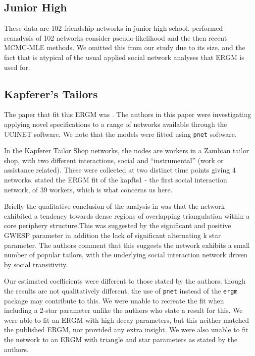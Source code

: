 \documentclass[
]{statsoc}
\begin{document}
\subsection{Junior High}

These data are 102 friendship networks in junior high school.
\cite{Lubbers2007} performed reanalysis of 102 networks consider
pseudo-likelihood and the then recent MCMC-MLE methods. We omitted this
from our study due to its size, and the fact that is atypical of the
usual applied social network analyses that ERGM is used for.

\subsection{Kapferer's Tailors}

The paper that fit this ERGM was \cite{Robins2007}. The authors in this
paper were investigating applying novel specifications to a range of
networks available through the UCINET software. We note that the models
were fitted using \texttt{pnet} software.

In the Kapferer Tailor Shop networks, the nodes are workers in a Zambian
tailor shop, with two different interactions, social and
``instrumental'' (work or assistance related). These were collected at
two distinct time points giving 4 networks. \cite{Robins2007} stated the
ERGM fit of the kapfts1 - the first social interaction network, of 39
workers, which is what concerns us here.

Briefly the qualitative conclusion of the analysis in \cite{Robins2007}
was that the network exhibited a tendency towards dense regions of
overlapping triangulation within a core periphery structure.This was
suggested by the significant and positive GWESP parameter in addition
the lack of significant alternating k star parameter. The authors
comment that this suggests the network exhibits a small number of
popular tailors, with the underlying social interaction network driven
by social transitivity.

Our estimated coefficients were different to those stated by the
authors, though the results are not qualitatively different, the use of
\texttt{pnet} instead of the \texttt{ergm} package may contribute to
this. We were unable to recreate the fit when including a 2-star
parameter unlike the authors who state a result for this. We were able
to fit an ERGM with high decay parameters, but this neither matched the
published ERGM, nor provided any extra insight. We were also unable to
fit the network to an ERGM with triangle and star parameters as stated
by the authors.
\end{document}

